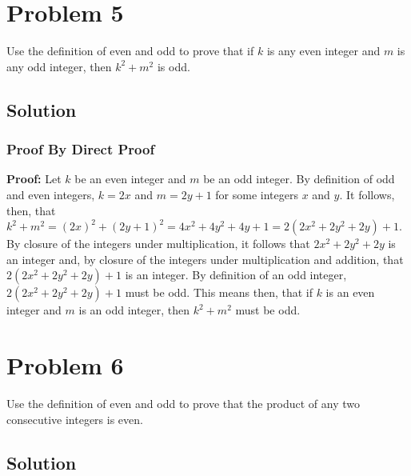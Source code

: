 \documentclass[table]{article}
\begin{document}
\section{Problem 5}
Use the definition of even and odd to prove that if $k$ is any even integer and $m$ is any odd
integer, then $k^2 + m^2$ is odd.
\subsection{Solution}
\subsubsection{Proof By Direct Proof}
\textbf{Proof:} Let $k$ be an even integer and $m$ be an odd integer. By definition of odd and even integers, $k=2x$ and $m=2y+1$ for some integers $x$ and $y$. It follows, then, that $k^2 + m^2 = (2x)^2 + (2y+1)^2 = 4x^2 + 4y^2 + 4y + 1 = 2(2x^2 + 2y^2 + 2y) + 1$. By closure of the integers under multiplication, it follows that $2x^2 + 2y^2 + 2y$ is an integer and, by closure of the integers under multiplication and addition, that $2(2x^2 + 2y^2 + 2y) + 1$ is an integer. By definition of an odd integer, $2(2x^2 + 2y^2 + 2y) + 1$ must be odd. This means then, that if $k$ is an even integer and $m$ is an odd integer, then $k^2 + m^2$ must be odd.
\section{Problem 6}
Use the definition of even and odd to prove that the product of any two consecutive
integers is even.
\subsection{Solution}
\end{document}
